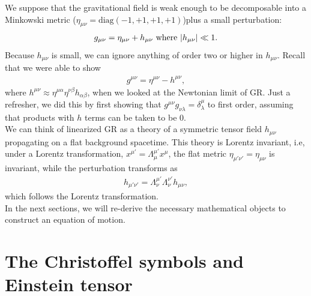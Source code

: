 \documentclass{book}
\numberwithin{equation}{section}
\theoremstyle{definition}
\begin{document}
We suppose that the gravitational field is weak enough to be decomposable into a Minkowski metric ($\eta_{\mu\nu} = \text{diag}(-1,+1,+1,+1)$)plus a small perturbation:
\begin{align}
g_{\mu\nu} = \eta_{\mu\nu} + h_{\mu\nu} \text{ where } \abs{h_{\mu\nu}} \ll 1.
\end{align}
Because $h_{\mu\nu}$ is small, we can ignore anything of order two or higher in $h_{\mu\nu}$. Recall that we were able to show 
\begin{align}
g^{\mu\nu} = \eta^{\mu\nu} - h^{\mu\nu},
\end{align}
where $h^{\mu\nu} \approx \eta^{\mu \alpha}\eta^{\nu\beta}h_{\alpha\beta}$, when we looked at the Newtonian limit of GR. Just a refresher, we did this by first showing that $g^{\mu\nu}g_{\nu\lambda} = \delta^{\mu}_{\lambda}$ to first order, assuming that products with $h$ terms can be taken to be 0. \\

We can think of linearized GR as a theory of a symmetric tensor field $h_{\mu\nu}$ propagating on a flat background spacetime. This theory is Lorentz invariant, i.e, under a Lorentz transformation, $x^{\mu'} = \Lambda^{\mu'}_{\mu} x^{\mu}$, the flat metric $\eta_{\mu'\nu'} = \eta_{\mu\nu}$ is invariant, while the perturbation transforms as
\begin{align}
h_{\mu'\nu'} = \Lambda^{\mu'}_\nu \Lambda^{\nu'}_\nu h_{\mu\nu},
\end{align}
which follows the Lorentz transformation. \\

In the next sections, we will re-derive the necessary mathematical objects to construct an equation of motion. 


\section{The Christoffel symbols and Einstein tensor}
\end{document}

